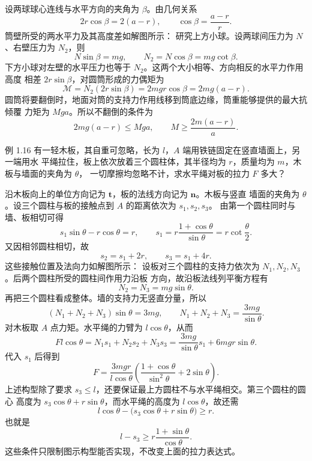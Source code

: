 \begin{xesolution}
设两球球心连线与水平方向的夹角为 $\beta$。由几何关系
\[
  2r\cos\beta=2(a-r),
  \qquad
  \cos\beta=\frac{a-r}{r}.
\]
筒壁所受的两水平力及其高度差如解图所示：
\soldiagOneFifteen
研究上方小球。设两球间压力为 $N$、右壁压力为 $N_2$，则
\[
  N\sin\beta=mg,
  \qquad
  N_2=N\cos\beta=mg\cot\beta.
\]
下方小球对左壁的水平压力也等于 $N_2$。这两个大小相等、方向相反的水平力作用高度
相差 $2r\sin\beta$，对圆筒形成的力偶矩为
\[
  \mathcal M=N_2(2r\sin\beta)
  =2mgr\cos\beta=2mg(a-r).
\]
圆筒将要翻倒时，地面对筒的支持力作用线移到筒底边缘，筒重能够提供的最大抗倾覆
力矩为 $Mga$。所以不翻倒的条件为
\[
  2mg(a-r)\le Mga,
  \qquad
  \boxed{M\ge \frac{2m(a-r)}{a}}.
\]
\end{xesolution}

\begin{origexamplebox}{例 1.16}
有一轻木板，其自重可忽略，长为 $l$，$A$ 端用铁链固定在竖直墙面上，另一端用水
平绳拉住，板上依次放着三个圆柱体，其半径均为 $r$，质量均为 $m$，木板与墙面的夹角为 $\theta$，
一切摩擦均忽略不计，求水平绳对板的拉力 $F$ 多大？
\end{origexamplebox}

\begin{xesolution}
沿木板向上的单位方向记为 $\boldsymbol t$，板的法线方向记为 $\boldsymbol n$。木板与竖直
墙面的夹角为 $\theta$。设三个圆柱与板的接触点到 $A$ 的距离依次为 $s_1,s_2,s_3$。
由第一个圆柱同时与墙、板相切可得
\[
  s_1\sin\theta-r\cos\theta=r,
  \qquad
  s_1=r\frac{1+\cos\theta}{\sin\theta}=r\cot\frac\theta2.
\]
又因相邻圆柱相切，故
\[
  s_2=s_1+2r,
  \qquad
  s_3=s_1+4r.
\]
这些接触位置及法向力如解图所示：
\soldiagOneSixteen
设板对三个圆柱的支持力依次为 $N_1,N_2,N_3$。后两个圆柱所受的圆柱间作用力沿板
方向，故沿板法线列平衡方程有
\[
  N_2=N_3=mg\sin\theta.
\]
再把三个圆柱看成整体。墙的支持力无竖直分量，所以
\[
  (N_1+N_2+N_3)\sin\theta=3mg,
  \qquad
  N_1+N_2+N_3=\frac{3mg}{\sin\theta}.
\]
对木板取 $A$ 点力矩。水平绳的力臂为 $l\cos\theta$，从而
\[
  Fl\cos\theta=N_1s_1+N_2s_2+N_3s_3
  =\frac{3mg}{\sin\theta}s_1+6mgr\sin\theta.
\]
代入 $s_1$ 后得到
\[
  \boxed{F=\frac{3mgr}{l\cos\theta}
  \left(\frac{1+\cos\theta}{\sin^2\theta}+2\sin\theta\right)}.
\]
上述构型除了要求 $s_3\le l$，还要保证最上方圆柱不与水平绳相交。第三个圆柱的圆心
高度为 $s_3\cos\theta+r\sin\theta$，而水平绳的高度为 $l\cos\theta$，故还需
\[
  l\cos\theta-\bigl(s_3\cos\theta+r\sin\theta\bigr)\ge r.
\]
也就是
\[
  \boxed{l-s_3\ge r\frac{1+\sin\theta}{\cos\theta}}.
\]
这些条件只限制图示构型能否实现，不改变上面的拉力表达式。
\end{xesolution}

